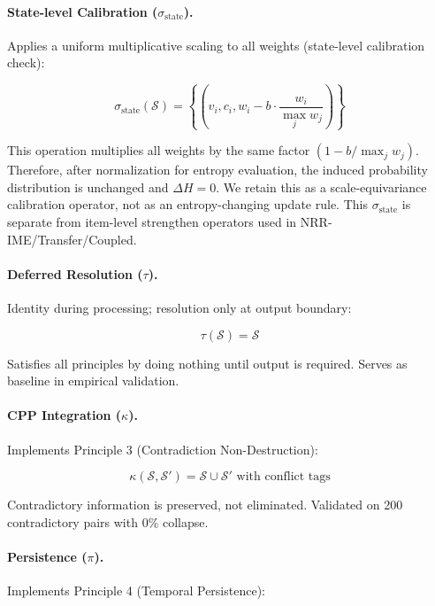 \documentclass[11pt,a4paper]{article}
\begin{document}
\paragraph{State-level Calibration ($\sigma_{\mathrm{state}}$).}
Applies a uniform multiplicative scaling to all weights (state-level calibration check):

\begin{equation}
\sigma_{\mathrm{state}}(\mathcal{S}) = \left\{
  \left(v_i, c_i, w_i - b \cdot \frac{w_i}{\max_j w_j}\right)
\right\}
\end{equation}

This operation multiplies all weights by the same factor
$\left(1 - b/\max_j w_j\right)$.
Therefore, after normalization for entropy evaluation, the induced probability
distribution is unchanged and $\Delta H = 0$. We retain this as a
scale-equivariance calibration operator, not as an entropy-changing update rule.
This $\sigma_{\mathrm{state}}$ is separate from item-level strengthen operators
used in NRR-IME/Transfer/Coupled.

\paragraph{Deferred Resolution ($\tau$).}
Identity during processing; resolution only at output boundary:

\begin{equation}
\tau(\mathcal{S}) = \mathcal{S}
\end{equation}

Satisfies all principles by doing nothing until output is required. 
Serves as baseline in empirical validation.

\paragraph{CPP Integration ($\kappa$).}
Implements Principle 3 (Contradiction Non-Destruction):

\begin{equation}
\kappa(\mathcal{S}, \mathcal{S}') = \mathcal{S} \cup \mathcal{S}' 
\text{ with conflict tags}
\end{equation}

Contradictory information is preserved, not eliminated. Validated on 
200 contradictory pairs with 0\% collapse.

\paragraph{Persistence ($\pi$).}
Implements Principle 4 (Temporal Persistence):
\end{document}
